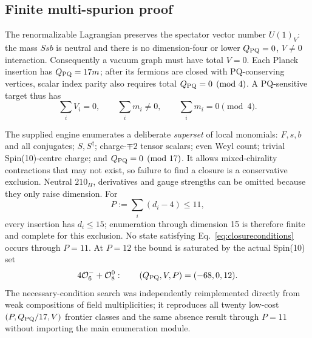\documentclass[11pt,a4paper]{article}
\begin{document}
\subsection*{Finite multi-spurion proof}
The renormalizable Lagrangian preserves the spectator vector number
$U(1)_V$: the mass $Ssb$ is neutral and there is no dimension-four or
lower $Q_{\rm PQ}=0$, $V\neq0$ interaction. Consequently a vacuum graph
must have total $V=0$. Each Planck insertion has $Q_{\rm PQ}=17m$; after
its fermions are closed with PQ-conserving vertices, scalar index parity
also requires total $Q_{\rm PQ}=0\pmod4$. A PQ-sensitive target thus has
\begin{equation}
 \sum_i V_i=0,\qquad \sum_i m_i\neq0,\qquad
 \sum_i m_i=0\pmod4 .
\label{eq:closureconditions}
\end{equation}

The supplied engine enumerates a deliberate \emph{superset} of local
monomials: $F,s,b$ and all conjugates; $S,S^\dagger$; charge-$\mp2$
tensor scalars; even Weyl count; trivial Spin(10)-centre charge; and
$Q_{\rm PQ}=0\pmod{17}$. It allows mixed-chirality contractions that may
not exist, so failure to find a closure is a conservative exclusion.
Neutral $210_H$, derivatives and gauge strengths can be omitted because
they only raise dimension. For
\begin{equation}
 P:=\sum_i(d_i-4)\leq11,
\end{equation}
every insertion has $d_i\leq15$; enumeration through dimension 15 is
therefore finite and complete for this exclusion. No state satisfying
Eq.~\eqref{eq:closureconditions} occurs through $P=11$. At $P=12$ the
bound is saturated by the actual Spin(10) set
\begin{equation}
 4{\cal O}_6^-+{\cal O}_8^0:\qquad
 (Q_{\rm PQ},V,P)=(-68,0,12).
\label{eq:certificate}
\end{equation}
The necessary-condition search was independently reimplemented directly
from weak compositions of field multiplicities; it reproduces all twenty
low-cost $(P,Q_{\rm PQ}/17,V)$ frontier classes and the same absence result
through $P=11$ without importing the main enumeration module.
\end{document}
